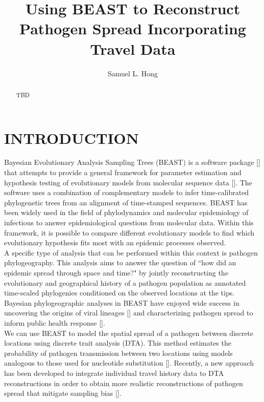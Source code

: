 \documentclass{article}
\title{Using BEAST to Reconstruct Pathogen Spread Incorporating Travel Data}
\author{Samuel L. Hong}
\begin{document}
\maketitle

\begin{abstract}
\begin{adjustwidth}{0.5cm}{0.5cm}
TBD 
\end{adjustwidth}
\end{abstract}

\section*{INTRODUCTION}

Bayesian Evolutionary Analysis Sampling Trees (BEAST) is a software package [\cite{beast110}] that attempts to provide a general framework for parameter estimation and hypothesis testing of evolutionary models from molecular sequence data [\cite{beastOG,beast17,beast110}]. The software uses a combination of complementary models to infer time-calibrated phylogenetic trees from an alignment of time-stamped sequences. BEAST has been widely used in the field of phylodynamics and molecular epidemiology of infectious to answer epidemiological questions from molecular data. Within this framework, it is possible to compare different evolutionary models to find which evolutionary hypothesis fits most with an epidemic processes observed. \\

A specific type of analysis that can be performed within this context is pathogen phylogeography. This analysis aims to answer the question of ``how did an epidemic spread through space and time?" by jointly reconstructing the evolutionary and geographical history of a pathogen population as annotated time-scaled phylogenies conditioned on the observed locations at the tips. Bayesian phylogeographic analyses in BEAST have enjoyed wide success in uncovering the origins of viral lineages [\cite{hiv}] and characterizing pathogen spread to inform public health response [\cite{ebola}]. \\

We can use BEAST to model the spatial spread of a pathogen between discrete locations using discrete trait analysis (DTA). This method estimates the probability of pathogen transmission between two locations using models analogous to those used for nucleotide substitution [\cite{dta}]. Recently, a new approach has been developed to integrate individual travel history data to DTA reconstructions in order to obtain more realistic reconstructions of pathogen spread that mitigate sampling bias [\cite{travhist}]. \\
\end{document}
